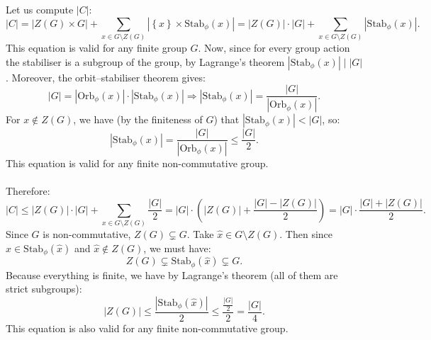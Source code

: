 \begin{solution}
\[    \]
    Let us compute \( |C| \):
    \begin{equation}
        \label{1.1} \tag{*} |C| = |Z\left(G\right)\times G| + \sum_{x\in G \setminus Z\left(G\right)} |\left\{ x \right\} \times \mathrm{Stab}_{\phi}\left(x\right)| = |Z\left(G\right)|\cdot |G| + \sum_{x\in G \setminus Z\left(G\right)} |\mathrm{Stab}_{\phi}\left(x\right)|.
    \end{equation}
    This equation is valid for any finite group \( G \). Now, since for every group action the stabiliser is a subgroup of the group, by Lagrange's theorem \( |\mathrm{Stab}_{\phi}\left(x\right)| \mid |G| \). Moreover, the orbit–stabiliser theorem gives:
    \[
        |G| = \left|\mathrm{Orb}_{\phi}\left(x\right)\right| \cdot \left|\mathrm{Stab}_{\phi}\left(x\right)\right| \Rightarrow \left|\mathrm{Stab}_{\phi}\left(x\right)\right| = \frac{|G|}{\left|\mathrm{Orb}_{\phi}\left(x\right)\right|}.
    \]
    For \( x\notin Z\left(G\right) \), we have (by the finiteness of \( G \)) that \( \left|\mathrm{Stab}_{\phi}\left(x\right)\right| < |G| \), so:
    \begin{equation}
        \label{1.2} \tag{1} \left|\mathrm{Stab}_{\phi}\left(x\right)\right| = \frac{|G|}{\left|\mathrm{Orb}_{\phi}\left(x\right)\right|} \leq\frac{|G|}{2}.
    \end{equation}
    This equation is valid for any finite non-commutative group.
    \\\\
    Therefore:
    \[
        |C| \leq |Z\left(G\right)|\cdot |G| + \sum_{x\in G \setminus Z\left(G\right)} \frac{|G|}{2} = |G|\cdot\left( |Z\left(G\right)| + \frac{|G| - |Z\left(G\right)|}{2} \right) = |G|\cdot \frac{|G| + |Z\left(G\right)|}{2}.
    \]
    Since \( G \) is non-commutative, \( Z\left(G\right)\subsetneq G \). Take \( \hat{x} \in G \setminus Z\left(G\right) \). Then since \( \hat{x} \in \mathrm{Stab}_{\phi}\left(\hat{x}\right) \) and \( \hat{x} \notin Z\left(G\right) \), we must have:
    \[
        Z\left(G\right)\subsetneq \mathrm{Stab}_{\phi}\left(\hat{x}\right) \subsetneq G.
    \]
    Because everything is finite, we have by Lagrange's theorem (all of them are strict subgroups):
    \begin{equation}
        \label{1.3} \tag{2} |Z\left(G\right)| \leq \frac{|\mathrm{Stab}_{\phi}\left(\hat{x}\right)|}{2} \leq \frac{\frac{|G|}{2}}{2} = \frac{|G|}{4}.
    \end{equation}
    This equation is also valid for any finite non-commutative group.
    \\\\

\end{solution}
